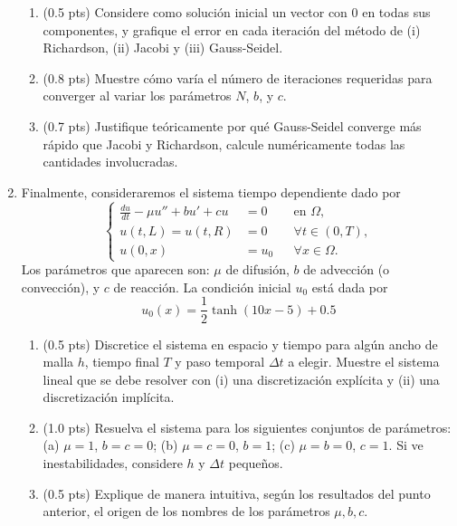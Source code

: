 \documentclass{article}
\begin{document}
\begin{enumerate}
    \begin{enumerate}
        \item (0.5 pts)  Considere como solución inicial un vector con 0 en todas sus componentes, y grafique el error en cada iteración del método de (i) Richardson, (ii) Jacobi y (iii) Gauss-Seidel.
        \item (0.8 pts) Muestre cómo varía el número de iteraciones requeridas para converger al variar los parámetros $N$, $b$, y $c$.
        \item (0.7 pts) Justifique teóricamente por qué Gauss-Seidel converge más rápido que Jacobi y Richardson, calcule numéricamente todas las cantidades involucradas.
    \end{enumerate}

\item Finalmente, consideraremos el sistema tiempo dependiente dado por
        $$
            \left\lbrace\begin{aligned}
                \frac{d u}{d t}- \mu u'' + b u' + c u &= 0 && \text{en $\Omega$},\\
                u(t, L) = u(t, R) &= 0 &&\forall t\in (0,T), \\ 
                u(0, x) &= u_0 &&\forall x\in \Omega.
            \end{aligned}\right.
        $$
Los parámetros que aparecen son: $\mu$ de difusión, $b$ de advección (o convección), y $c$ de reacción. La condición inicial $u_0$ está dada por    
        $$ u_0(x) = \frac 1 2 \tanh (10x - 5) + 0.5 $$

    \begin{enumerate}
        \item (0.5 pts) Discretice el sistema en espacio y tiempo para algún ancho de malla $h$, tiempo final $T$ y paso temporal $\Delta t$ a elegir. Muestre el sistema lineal que se debe resolver con (i) una discretización explícita y (ii) una discretización implícita.
        \item (1.0 pts) Resuelva el sistema para los siguientes conjuntos de parámetros: (a) $\mu=1$, $b=c=0$; (b) $\mu=c=0$, $b=1$; (c) $\mu=b=0$, $c=1$. Si ve inestabilidades, considere $h$ y $\Delta t$ pequeños.
        \item (0.5 pts) Explique de manera intuitiva, según los resultados del punto anterior, el origen de los nombres de los parámetros $\mu,b,c$.
    \end{enumerate}
\end{enumerate}
\end{document}

